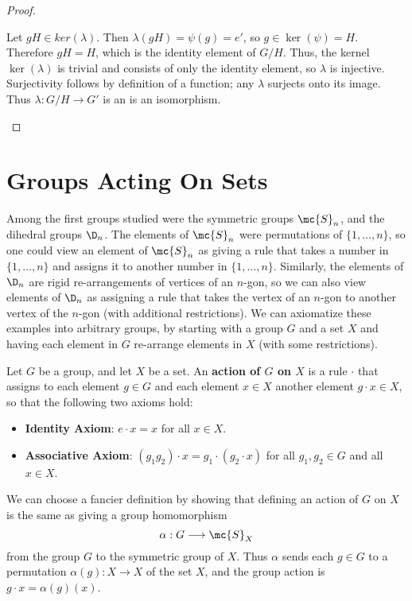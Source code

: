 \documentclass[math1530-lecture-notes]{subfiles}
\begin{document}
\begin{proof}[Proof]
\begin{enumerate}
    Let $gH\in ker(\lambda)$. Then $\lambda(gH)=\psi(g)=e'$, so $g\in \ker{(\psi)}=H$. Therefore
    $gH=H$, which is the identity element of $G / H$. Thus, the kernel $\ker{(\lambda)}$ is trivial
    and consists of only the identity element, so $\lambda$ is injective. Surjectivity follows by
    definition of a function; any $\lambda$ surjects onto its image. Thus $\lambda: G/H\to G'$ is an
    is an isomorphism.
  \end{enumerate}
\end{proof}

\section{Groups Acting On Sets}

Among the first groups studied were the symmetric groups $\mc{S}_n$, and the dihedral groups $\D_n$.
The elements of $\mc{S}_n$ were permutations of $\{ 1,\ldots,n \}$, so one could view an element of
$\mc{S}_n$ as giving a rule that takes a number in $\{ 1,\ldots,n \}$ and assigns it to another
number in $\{ 1,\ldots,n \}$. Similarly, the elements of $\D_n$ are rigid re-arrangements of
vertices of an $n$-gon, so we can also view elements of $\D_n$ as assigning a rule that takes the
vertex of an $n$-gon to another vertex of the $n$-gon (with additional restrictions). We can
axiomatize these examples into arbitrary groups, by starting with a group $G$ and a set $X$ and
having each element in $G$ re-arrange elements in $X$ (with some restrictions).

\begin{definition}{}
  Let $G$ be a group, and let $X$ be a set. An \textbf{action of $G$ on $X$} is a rule $\cdot$ that
  assigns to each element $g\in G$ and each element $x\in X$ another element $g\cdot x\in X$, so
  that the following two axioms hold:
  \begin{itemize}
    \item \textbf{Identity Axiom}: $e\cdot x=x$ for all $x\in X$.
    \item \textbf{Associative Axiom}: $(g_1g_2)\cdot x=g_1\cdot (g_2\cdot x)$ for all $g_1,g_2\in
      G$ and all $x\in X$.
  \end{itemize}
\end{definition}

\begin{remark}
  We can choose a fancier definition by showing that defining an action of $G$ on $X$ is the same as
  giving a group homomorphism \[
    \alpha: G\longrightarrow \mc{S}_X
  \] from the group $G$ to the symmetric group of $X$. Thus $\alpha$ sends each $g\in G$ to a
  permutation $\alpha(g):X\to X$ of the set $X$, and the group action is $g\cdot x=\alpha(g)(x)$.
\end{remark}
\end{document}
